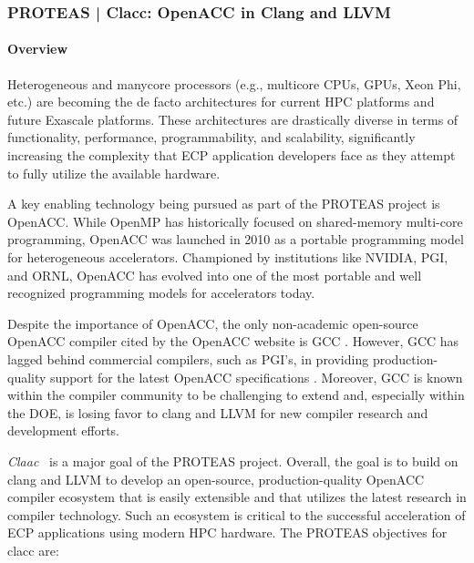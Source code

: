 \subsubsection{ PROTEAS | Clacc: OpenACC in Clang and LLVM}\label{s:clacc}

\newcommand{\todo}[1]{\textbf{\textcolor{red}{#1}}}

\paragraph{Overview}

Heterogeneous and manycore processors (e.g., multicore CPUs, GPUs, Xeon Phi,
etc.) are becoming the de facto architectures for current HPC platforms and
future Exascale platforms.  These architectures are drastically diverse in
terms of functionality, performance, programmability, and scalability,
significantly increasing the complexity that ECP application developers face
as they attempt to fully utilize the available hardware.

A key enabling technology being pursued as part of the PROTEAS project is
OpenACC.  While OpenMP has historically focused on shared-memory multi-core
programming, OpenACC was launched in 2010 as a portable programming model
for heterogeneous accelerators.  Championed by institutions like NVIDIA,
PGI, and ORNL, OpenACC has evolved into one of the most portable and well
recognized programming models for accelerators today.

Despite the importance of OpenACC, the only non-academic open-source OpenACC
compiler cited by the OpenACC website is GCC \cite{openaccOrgTools}.
However, GCC has lagged behind commercial compilers, such as PGI's, in
providing production-quality support for the latest OpenACC specifications
\cite{openACCValidationSuite}.  Moreover, GCC is known within the compiler
community to be challenging to extend and, especially within the DOE, is
losing favor to clang and LLVM for new compiler research and development
efforts.

\textit{Claac}~\cite{clacc:2018:denny} is a major goal of the PROTEAS project. 
Overall, the goal is to build on clang and LLVM to develop an
open-source, production-quality OpenACC compiler ecosystem that is easily
extensible and that utilizes the latest research in compiler technology.
Such an ecosystem is critical to the successful acceleration of ECP
applications using modern HPC hardware.  
The PROTEAS objectives for clacc are:

